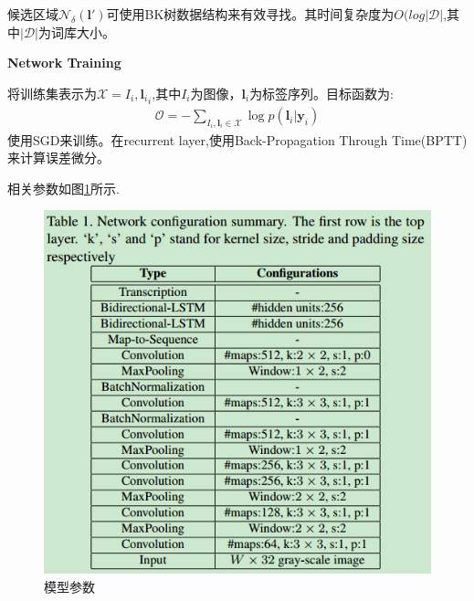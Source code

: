 \documentclass{article}
\begin{document}
候选区域$\mathcal{N}_\delta(\textbf{l}')$可使用BK树数据结构来有效寻找。其时间复杂度为$O(log|\mathcal{D}|$,其中$|\mathcal{D}|$为词库大小。

\textbf{Network Training}

将训练集表示为$\mathcal{X}={I_i,\textbf{l}_i}_i$,其中$I_i$为图像，$\textbf{l}_i$为标签序列。目标函数为:
\begin{align}
\mathcal{O} = - \sum_{I_i,\textbf{l}_i \in \mathcal{X}} \log p(\textbf{l}_i| \textbf{y}_i)
\end{align}
使用SGD来训练。在recurrent layer,使用Back-Propagation Through Time(BPTT)来计算误差微分。

相关参数如图\ref{Fig.crnn_table}所示.
\begin{figure}
\centering
\includegraphics[scale=0.5]{images/CRNN/crnn_table.png}
\caption{模型参数}
\label{Fig.crnn_table}
\end{figure}


\end{document}
